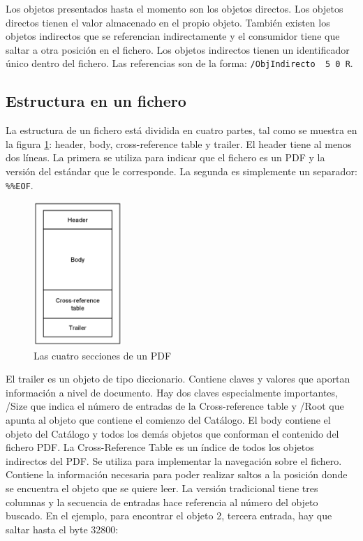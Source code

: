 Los objetos presentados hasta el momento son los objetos directos. Los objetos directos tienen el valor almacenado en el propio objeto. También existen los objetos indirectos que se referencian indirectamente y el consumidor tiene que saltar a otra posición en el fichero. Los objetos indirectos tienen un identificador único dentro del fichero. Las referencias son de la forma: \verb|/ObjIndirecto  5 0 R|.

\subsection{Estructura en un fichero}

La estructura de un fichero está dividida en cuatro partes, tal como se muestra en la figura \ref{fig:secciones-pdf}: header, body, cross-reference table y trailer. El header tiene al menos dos líneas. La primera se utiliza para indicar que el fichero es un PDF y la versión del estándar que le corresponde. La segunda es simplemente un separador: \verb|%%EOF|. 

\begin{figure}[hp!]
    \centering
    \includegraphics[width=0.3\textwidth]{imaxes/c-bases-teoricas/secciones-de-un-pdf.png}
    \caption{Las cuatro secciones de un PDF}
    \label{fig:secciones-pdf}
\end{figure}

El trailer es un objeto de tipo diccionario. Contiene claves y valores que aportan información a nivel de documento. Hay dos claves especialmente importantes, /Size que indica el número de entradas de la Cross-reference table y /Root que apunta al objeto que contiene el comienzo del Catálogo. El body contiene el objeto del Catálogo y todos los demás objetos que conforman el contenido del fichero PDF. La Cross-Reference Table es un índice de todos los objetos indirectos del PDF. Se utiliza para implementar la navegación sobre el fichero. Contiene la información necesaria para poder realizar saltos a la posición donde se encuentra el objeto que se quiere leer. La versión tradicional tiene tres columnas y la secuencia de entradas hace referencia al número del objeto buscado. En el ejemplo, para encontrar el objeto 2, tercera entrada, hay que saltar hasta el byte 32800:

